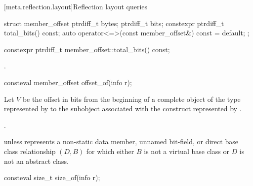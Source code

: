 [meta.reflection.layout]{Reflection layout queries}

%
%
\begin{itemdecl}
struct member_offset {
  ptrdiff_t bytes;
  ptrdiff_t bits;
  constexpr ptrdiff_t total_bits() const;
  auto operator<=>(const member_offset&) const = default;
};

constexpr ptrdiff_t member_offset::total_bits() const;
\end{itemdecl}

\begin{itemdescr}
\pnum
\returns
{}.
\end{itemdescr}

%
\begin{itemdecl}
consteval member_offset offset_of(info r);
\end{itemdecl}

\begin{itemdescr}
\pnum
Let $V$ be the offset in bits from the beginning of a complete object
of the type represented by 
to the subobject associated with the construct represented by .

\pnum
\returns
{}.

\pnum
\throws
{} unless
 represents a non-static data member,
unnamed bit-field, or
direct base class relationship $(D, B)$
for which either $B$ is not a virtual base class
or $D$ is not an abstract class.
\end{itemdescr}

%
\begin{itemdecl}
consteval size_t size_of(info r);
\end{itemdecl}

